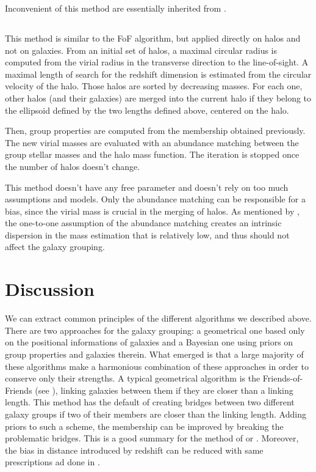 Inconvenient of this method are essentially inherited from \citet{Yang+07}.

\subsection{\citet{MunozCuartas+12}}
\label{sub:munozcuartas12}

This method is similar to the FoF algorithm, but applied directly on halos and
not on galaxies. From an initial set of halos, a maximal circular radius is
computed from the virial radius in the transverse direction to the
line-of-sight. A maximal length of search for the redshift dimension is
estimated from the circular velocity of the halo. Those halos are sorted by
decreasing masses. For each one, other halos (and their galaxies) are merged
into the current halo if they belong to the ellipsoid defined by the two
lengths defined above, centered on the halo.

Then, group properties are computed from the membership obtained previously.
The new virial masses are evaluated with an abundance matching between the
group stellar masses and the halo mass function. The iteration is stopped once
the number of halos doesn't change.

This method doesn't have any free parameter and doesn't rely on too much
assumptions and models. Only the abundance matching can be responsible for a
bias, since the virial mass is crucial in the merging of halos. As mentioned by
\citet{Yang+07}, the one-to-one assumption of the abundance matching creates an
intrinsic dispersion in the mass estimation that is relatively low, and thus
should not affect the galaxy grouping.

\section{Discussion}
\label{sec:gga_discussion}

We can extract common principles of the different algorithms we described
above. There are two approaches for the galaxy grouping: a geometrical one
based only on the positional informations of galaxies and a Bayesian one using
priors on group properties and galaxies therein. What emerged is that a large
majority of these algorithms make a harmonious combination of these approaches
in order to conserve only their strengths. A typical geometrical algorithm is
the Friends-of-Friends (see ),
linking galaxies between them if they are closer than a linking length. This
method has the default of creating bridges between two different galaxy groups
if two of their members are closer than the linking length. Adding priors to
such a scheme, the membership can be improved by breaking the problematic
bridges. This is a good summary for the method of \citet{Marinoni+02} or
\citet{MunozCuartas+12}. Moreover, the bias in distance introduced by redshift
can be reduced with same prescriptions ad done in \citet{Liu+08}.

